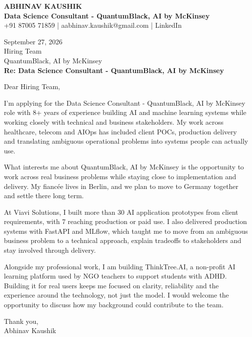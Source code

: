 \documentclass[10pt,a4paper]{article}
\begin{document}
\begin{center}
{\Large\bfseries ABHINAV KAUSHIK}\\[2pt]
{\bfseries Data Science Consultant - QuantumBlack, AI by McKinsey}\\[2pt]
+91 87005 71859 \quad | \quad aabhinav.kaushik@gmail.com \quad | \quad LinkedIn
\end{center}
\vspace{8pt}
September 27, 2026\\[6pt]
Hiring Team\\
QuantumBlack, AI by McKinsey\\[4pt]
\textbf{Re: Data Science Consultant - QuantumBlack, AI by McKinsey}

Dear Hiring Team,

I’m applying for the Data Science Consultant - QuantumBlack, AI by McKinsey role with 8+ years of experience building AI and machine learning systems while working closely with technical and business stakeholders. My work across healthcare, telecom and AIOps has included client POCs, production delivery and translating ambiguous operational problems into systems people can actually use.

What interests me about QuantumBlack, AI by McKinsey is the opportunity to work across real business problems while staying close to implementation and delivery. My fiancée lives in Berlin, and we plan to move to Germany together and settle there long term.

At Viavi Solutions, I built more than 30 AI application prototypes from client requirements, with 7 reaching production or paid use. I also delivered production systems with FastAPI and MLflow, which taught me to move from an ambiguous business problem to a technical approach, explain tradeoffs to stakeholders and stay involved through delivery.

Alongside my professional work, I am building ThinkTree.AI, a non-profit AI learning platform used by NGO teachers to support students with ADHD. Building it for real users keeps me focused on clarity, reliability and the experience around the technology, not just the model. I would welcome the opportunity to discuss how my background could contribute to the team.

Thank you,\\
Abhinav Kaushik
\end{document}
